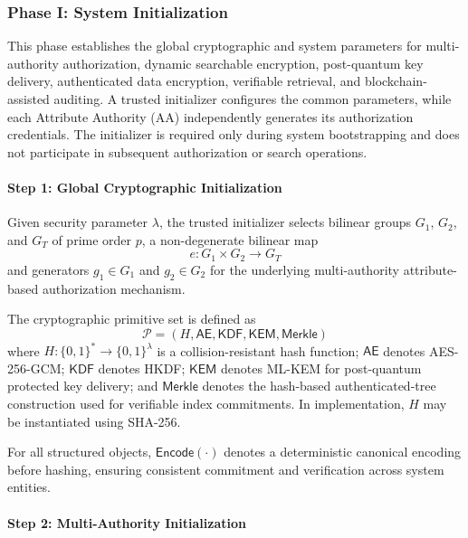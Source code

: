 \documentclass{ieeetj}
\theoremstyle{ieee-style}
\begin{document}
\subsubsection*{\textbf{Phase I: System Initialization}}

This phase establishes the global cryptographic and system parameters for
multi-authority authorization, dynamic searchable encryption,
post-quantum key delivery, authenticated data encryption, verifiable
retrieval, and blockchain-assisted auditing. A trusted initializer
configures the common parameters, while each Attribute Authority (AA)
independently generates its authorization credentials. The initializer
is required only during system bootstrapping and does not participate in
subsequent authorization or search operations.

\paragraph*{Step 1: Global Cryptographic Initialization}

Given security parameter $\lambda$, the trusted initializer selects
bilinear groups $G_1$, $G_2$, and $G_T$ of prime order $p$, a
non-degenerate bilinear map
\begin{equation}
e:G_1\times G_2\rightarrow G_T
\end{equation}
and generators $g_1\in G_1$ and $g_2\in G_2$ for the underlying
multi-authority attribute-based authorization mechanism.

The cryptographic primitive set is defined as
\begin{equation}
\mathcal{P}=
\left(
H,\mathsf{AE},\mathsf{KDF},\mathsf{KEM},\mathsf{Merkle}
\right)
\end{equation}
where $H:\{0,1\}^{*}\rightarrow\{0,1\}^{\lambda}$ is a
collision-resistant hash function; $\mathsf{AE}$ denotes AES-256-GCM;
$\mathsf{KDF}$ denotes HKDF; $\mathsf{KEM}$ denotes ML-KEM for
post-quantum protected key delivery; and $\mathsf{Merkle}$ denotes the
hash-based authenticated-tree construction used for verifiable index
commitments. In implementation, $H$ may be instantiated using SHA-256.

For all structured objects, $\mathsf{Encode}(\cdot)$ denotes a
deterministic canonical encoding before hashing, ensuring consistent
commitment and verification across system entities.

\paragraph*{Step 2: Multi-Authority Initialization}
\end{document}
